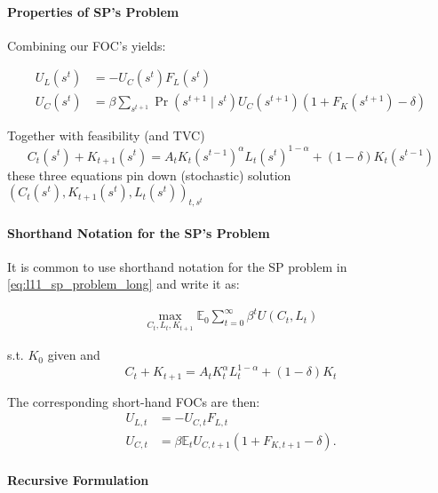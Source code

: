 \documentclass[10pt]{article}
\begin{document}
\paragraph{Properties of SP's Problem}

Combining our FOC's yields:

\begin{align}
    U_L\left(s^t\right) & =-U_C\left(s^t\right) F_L\left(s^t\right) \\
    U_C\left(s^t\right) & =\beta \sum_{s^{t+1}} \operatorname{Pr}\left(s^{t+1} \mid s^t\right) U_C\left(s^{t+1}\right)\left(1+F_K\left(s^{t+1}\right)-\delta\right)
\end{align}

Together with feasibility (and TVC)
$$
C_t\left(s^t\right)+K_{t+1}\left(s^t\right)=A_t K_t\left(s^{t-1}\right)^\alpha L_t\left(s^t\right)^{1-\alpha}+(1-\delta) K_t\left(s^{t-1}\right)
$$
these three equations pin down (stochastic) solution $\left(C_t\left(s^t\right), K_{t+1}\left(s^t\right), L_t\left(s^t\right)\right)_{t, s^t}$



\paragraph{Shorthand Notation for the SP's Problem}

It is common to use shorthand notation for the SP problem in \eqref{eq:l11_sp_problem_long} and write it as:

\begin{align}
    \max _{C_t, L_t, K_{t+1}} \mathbb{E}_0 \sum_{t=0}^{\infty} \beta^t U\left(C_t, L_t\right)
\end{align}

s.t. $K_0$ given and
$$
C_t+K_{t+1}=A_t K_t^\alpha L_t^{1-\alpha}+(1-\delta) K_t
$$

The corresponding short-hand FOCs are then:
$$
\begin{aligned}
U_{L, t} & =-U_{C, t} F_{L, t} \\
U_{C, t} & =\beta \mathbb{E}_t U_{C, t+1}\left(1+F_{K, t+1}-\delta\right) .
\end{aligned}
$$


\paragraph{Recursive Formulation}
\end{document}
